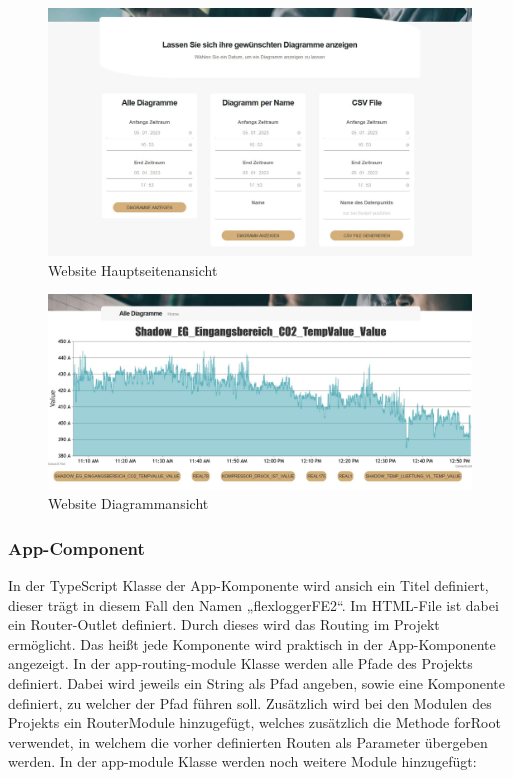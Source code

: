 \begin{figure}[h t]
    \centering
    \includegraphics[scale=0.45]{pics/FlexLoggerWebsiteFormulare.jpg}
    \caption{Website Hauptseitenansicht}
    \label{fig:impl:FlexLoggerHauptseitenAnsicht}
\end{figure}

\begin{figure}[h t]
    \centering
    \includegraphics[scale=0.35]{pics/FlexLoggerWebsiteDiagramm.jpg}
    \caption{Website Diagrammansicht}
    \label{fig:impl:FlexLoggerDiagrammAnsicht}
\end{figure}

\subsubsection{App-Component}
In der TypeScript Klasse der App-Komponente wird ansich ein Titel definiert, dieser trägt in diesem Fall den Namen „flexloggerFE2“. Im HTML-File ist dabei ein Router-Outlet definiert. Durch dieses wird das Routing im Projekt ermöglicht. Das heißt jede Komponente wird praktisch in der App-Komponente angezeigt. In der app-routing-module Klasse werden alle Pfade des Projekts definiert. Dabei wird jeweils ein String als Pfad angeben, sowie eine Komponente definiert, zu welcher der Pfad führen soll. Zusätzlich wird bei den Modulen des Projekts ein RouterModule hinzugefügt, welches zusätzlich die Methode forRoot verwendet, in welchem die vorher definierten Routen als Parameter übergeben werden. In der app-module Klasse werden noch weitere Module hinzugefügt: 

